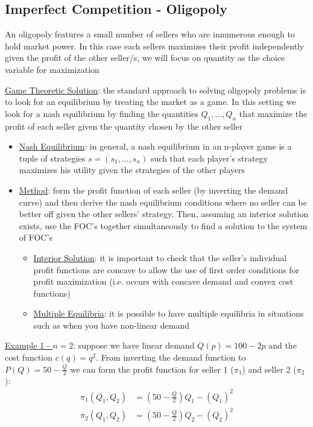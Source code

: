 \documentclass{article}
\begin{document}
\subsection{Imperfect Competition - Oligopoly}
An oligopoly features a small number of sellers who are innumerous enough to hold market power. In this case each sellers maximizes their profit independently given the profit of the other seller/s, we will focus on quantity as the choice variable for maximization \par \vspace{0.3em}
  \underline{Game Theoretic Solution}: the standard approach to solving oligopoly problems is to look for an equilibrium by treating the market as a game. In this setting we look for a nash equilibrium by finding the quantities $Q_{1}, \dots, Q_{n}$ that maximize the profit of each seller given the quantity chosen by the other seller
  \begin{itemize}
    \item  \underline{Nash Equilibrium}: in general, a nash equilibrium in an n-player game is a tuple of strategies $s = (s_{1}, \dots, s_{n})$ such that each player's strategy maximizes his utility given the strategies of the other players
    \item  \underline{Method}: form the profit function of each seller (by inverting the demand curve) and then derive the nash equilibrium conditions where no seller can be better off given the other sellers' strategy. Then, assuming an interior solution exists, use the FOC's together simultaneously to find a solution to the system of FOC's
    \begin{itemize}
      \item  \underline{Interior Solution}: it is important to check that the seller's individual profit functions are concave to allow the use of first order conditions for profit maximization (i.e. occurs with concave demand and convex cost functions)
      \item  \underline{Multiple Equilibria}: it is possible to have multiple equilibria in situations such as when you have non-linear demand
    \end{itemize}
  \end{itemize}
  \par
  \underline{Example 1 - $n = 2$}: suppose we have linear demand $Q(p) = 100 - 2p$ and the cost function $c(q) = q^{2}$. From inverting the demand function to $P(Q) = 50 - \tfrac{Q}{2}$ we can form the profit function for seller 1 ($\pi_{1}$) and seller 2 ($\pi_{2}$):
  \begin{align*}
    \pi_{1}(Q_{1}, Q_{2}) &= (50 - \frac{Q}{2})Q_{1} - (Q_{1})^{2} \\
    \pi_{2}(Q_{1}, Q_{2}) &= (50 - \frac{Q}{2})Q_{2} - (Q_{2})^{2}
  \end{align*}
\end{document}
